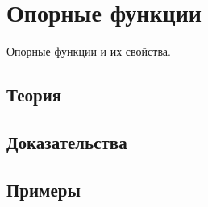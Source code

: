 
\section{Опорные функции}
\label{sec:2.4.02-support-functions}

\begin{ticket}
Опорные функции и их свойства.
\end{ticket}

\subsection*{Теория}

\subsection*{Доказательства}

\subsection*{Примеры}
